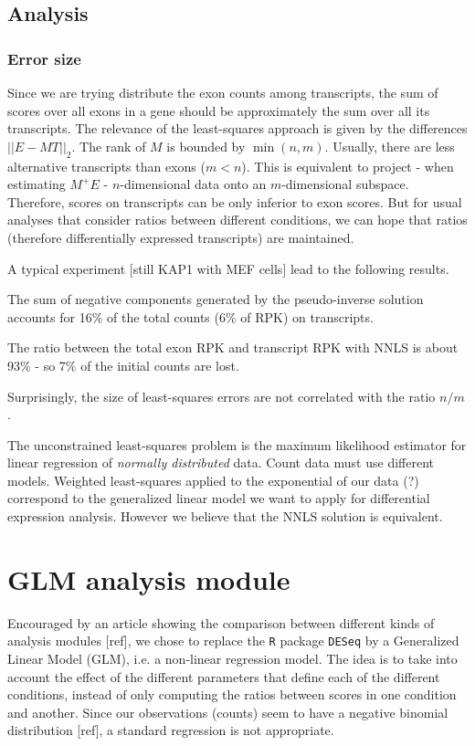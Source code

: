 \documentclass[a4paper,11pt]{article}
\begin{document}
\subsection{Analysis}

\subsubsection{Error size}
Since we are trying distribute the exon counts among transcripts, the sum of scores over all exons in a gene should be approximately the sum over all its transcripts. 
The relevance of the least-squares approach is given by the differences $||E-MT||_2$. 
The rank of $M$ is bounded by $\min(n,m)$. Usually, there are less alternative transcripts than exons ($m<n$). This is equivalent to project - when estimating $M^{+}E$ - $n$-dimensional data onto an $m$-dimensional subspace. Therefore, scores on transcripts can be only inferior to exon scores. But for usual analyses that consider ratios between different conditions, we can hope that ratios (therefore differentially expressed transcripts) are maintained. 

A typical experiment [still KAP1 with MEF cells] lead to the following results.

The sum of negative components generated by the pseudo-inverse solution accounts for 16\% of the total counts (6\% of RPK) on transcripts.

The ratio between the total exon RPK and transcript RPK with NNLS is about 93\% - so 7\% of the initial counts are lost.

Surprisingly, the size of least-squares errors are not correlated with the ratio $n/m$.

The unconstrained least-squares problem is the maximum likelihood estimator for linear regression of \emph{normally distributed} data. Count data must use different models. Weighted least-squares applied to the exponential of our data (?) correspond to the generalized linear model we want to apply for differential expression analysis. However we believe that the NNLS solution is equivalent.

\section{GLM analysis module}

Encouraged by an article showing the comparison between different kinds of analysis modules [ref], we chose to replace the \texttt{R} package \texttt{DESeq} by a Generalized Linear Model (GLM), i.e. a non-linear regression model. The idea is to take into account the effect of the different parameters that define each of the different conditions, instead of only computing the ratios between scores in one condition and another. Since our observations (counts) seem to have a negative binomial distribution [ref], a standard regression is not appropriate.
\end{document}

